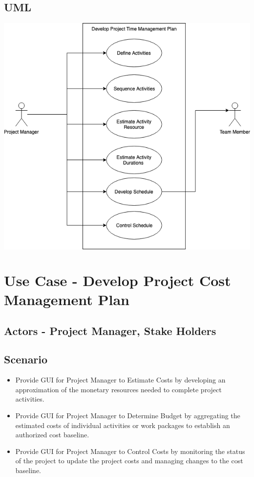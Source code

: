 \documentclass[10pt]{article}
\begin{document}
\subsection{UML}
\includegraphics[width=\textwidth]{usecase1}

\newpage
\section{Use Case - Develop Project Cost Management Plan}
\subsection{Actors - Project Manager, Stake Holders}
\subsection{Scenario}
\begin{itemize}
  \item Provide GUI for Project Manager to Estimate Costs by developing an approximation of the monetary resources needed to complete project activities.
  \item Provide GUI for Project Manager to Determine Budget by aggregating the estimated costs of individual activities or work packages to establish an authorized cost baseline.
  \item Provide GUI for Project Manager to Control Costs by monitoring the status of the project to update the project costs and managing changes to the cost baseline.
  
\end{itemize}
\end{document}
